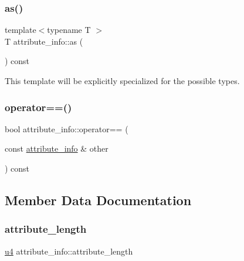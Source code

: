 \subsubsection{\texorpdfstring{as()}{as()}\hspace{0.1cm}{\footnotesize\ttfamily [2/2]}}
{\footnotesize\ttfamily template$<$typename T $>$ \\
T attribute\+\_\+info\+::as (\begin{DoxyParamCaption}{ }\end{DoxyParamCaption}) const}



This template will be explicitly specialized for the possible types. 

\mbox{\label{structattribute__info_a3cfff4cc60bf28912fafbe8860f76598}} 
\subsubsection{\texorpdfstring{operator==()}{operator==()}}
{\footnotesize\ttfamily bool attribute\+\_\+info\+::operator== (\begin{DoxyParamCaption}\item[{const \hyperlink{structattribute__info}{attribute\+\_\+info} \&}]{other }\end{DoxyParamCaption}) const}



\subsection{Member Data Documentation}
\mbox{\label{structattribute__info_a1ed8f679458c4bb0ed3315721588f50d}} 
\subsubsection{\texorpdfstring{attribute\+\_\+length}{attribute\_length}}
{\footnotesize\ttfamily \hyperlink{types_8h_af3b2d4b29fd9faedc984db3e062b3d5d}{u4} attribute\+\_\+info\+::attribute\+\_\+length}

\mbox{\label{structattribute__info_a19df9d4b42eb55ca5dc1bed98df89378}} 
